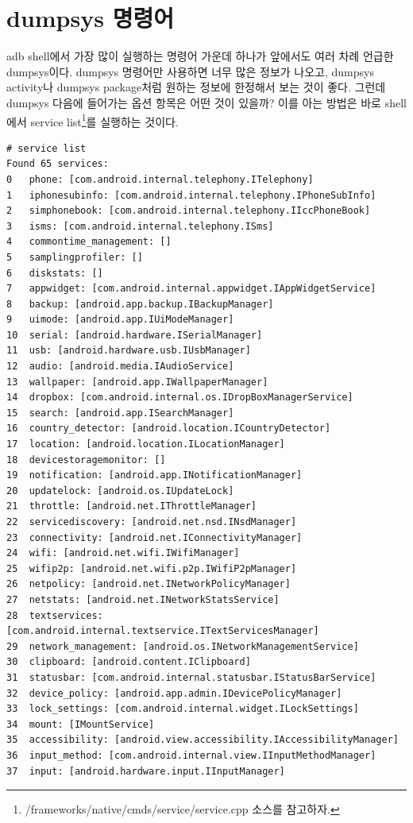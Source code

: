 \section{dumpsys 명령어}\label{sec:dumpsys}
adb shell에서 가장 많이 실행하는 명령어 가운데 하나가 앞에서도 여러 차례 언급한 dumpsys이다. 
dumpsys 명령어만 사용하면 너무 많은 정보가 나오고, dumpsys activity나 dumpsys package처럼 원하는 정보에 한정해서 보는 것이 좋다.
그런데 dumpsys 다음에 들어가는 옵션 항목은 어떤 것이 있을까? 
이를 아는 방법은 바로 shell에서 service list\footnote{/frameworks/native/cmds/service/service.cpp 소스를 참고하자.}를 실행하는 것이다.
\begin{lstlisting}[frame=single] 
# service list
Found 65 services:
0	phone: [com.android.internal.telephony.ITelephony]
1	iphonesubinfo: [com.android.internal.telephony.IPhoneSubInfo]
2	simphonebook: [com.android.internal.telephony.IIccPhoneBook]
3	isms: [com.android.internal.telephony.ISms]
4	commontime_management: []
5	samplingprofiler: []
6	diskstats: []
7	appwidget: [com.android.internal.appwidget.IAppWidgetService]
8	backup: [android.app.backup.IBackupManager]
9	uimode: [android.app.IUiModeManager]
10	serial: [android.hardware.ISerialManager]
11	usb: [android.hardware.usb.IUsbManager]
12	audio: [android.media.IAudioService]
13	wallpaper: [android.app.IWallpaperManager]
14	dropbox: [com.android.internal.os.IDropBoxManagerService]
15	search: [android.app.ISearchManager]
16	country_detector: [android.location.ICountryDetector]
17	location: [android.location.ILocationManager]
18	devicestoragemonitor: []
19	notification: [android.app.INotificationManager]
20	updatelock: [android.os.IUpdateLock]
21	throttle: [android.net.IThrottleManager]
22	servicediscovery: [android.net.nsd.INsdManager]
23	connectivity: [android.net.IConnectivityManager]
24	wifi: [android.net.wifi.IWifiManager]
25	wifip2p: [android.net.wifi.p2p.IWifiP2pManager]
26	netpolicy: [android.net.INetworkPolicyManager]
27	netstats: [android.net.INetworkStatsService]
28	textservices: [com.android.internal.textservice.ITextServicesManager]
29	network_management: [android.os.INetworkManagementService]
30	clipboard: [android.content.IClipboard]
31	statusbar: [com.android.internal.statusbar.IStatusBarService]
32	device_policy: [android.app.admin.IDevicePolicyManager]
33	lock_settings: [com.android.internal.widget.ILockSettings]
34	mount: [IMountService]
35	accessibility: [android.view.accessibility.IAccessibilityManager]
36	input_method: [com.android.internal.view.IInputMethodManager]
37	input: [android.hardware.input.IInputManager]

\end{lstlisting}
